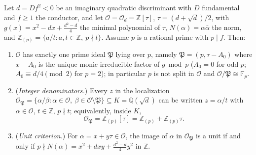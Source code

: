 
\begin{lemma}
  \label{lem-3-2-2}
  Let $d = Df^2 < 0$ be an imaginary quadratic discriminant with $D$ fundamental
  and $f \ge 1$ the conductor, and let
  $\mathcal{O} = \mathcal{O}_d = \mathbb{Z}[\tau]$, $\tau = (d + \sqrt{d})/2$,
  with $g(x) = x^2 - dx + \frac{d^2 - d}{4}$ the minimal polynomial of $\tau$,
  $N(\alpha) = \alpha\bar\alpha$ the norm, and
  $\mathbb{Z}_{(p)} = \{a/t : a, t \in \mathbb{Z},\ p \nmid t\}$.
  Assume $p$ is a rational prime with $p \mid f$. Then:
  \begin{enumerate}
    \item[(0)] $\mathcal{O}$ has exactly one prime ideal $\mathfrak{P}$ lying
      over $p$, namely $\mathfrak{P} = (p, \tau - A_0)$ where $x - A_0$ is the
      unique monic irreducible factor of $g \bmod p$ ($A_0 = 0$ for odd $p$;
      $A_0 \equiv d/4 \pmod 2$ for $p = 2$); in particular $p$ is not split in
      $\mathcal{O}$ and $\mathcal{O}/\mathfrak{P} \cong \mathbb{F}_p$.
    \item[(i)] (\emph{Integer denominators.}) Every $z$ in the localization
      $\mathcal{O}_{\mathfrak{P}} = \{\alpha/\beta : \alpha \in \mathcal{O},\
      \beta \in \mathcal{O} \setminus \mathfrak{P}\} \subseteq K = \mathbb{Q}(\sqrt{d})$
      can be written $z = \alpha/t$ with $\alpha \in \mathcal{O}$,
      $t \in \mathbb{Z}$, $p \nmid t$; equivalently, inside $K$,
      \[
        \mathcal{O}_{\mathfrak{P}}
          = \mathbb{Z}_{(p)}[\tau]
          = \mathbb{Z}_{(p)} + \mathbb{Z}_{(p)}\tau .
      \]
    \item[(ii)] (\emph{Unit criterion.}) For $\alpha = x + y\tau \in \mathcal{O}$,
      the image of $\alpha$ in $\mathcal{O}_{\mathfrak{P}}$ is a unit if and
      only if $p \nmid N(\alpha) = x^2 + dxy + \frac{d^2 - d}{4}y^2$ in
      $\mathbb{Z}$.
  \end{enumerate}
\end{lemma}

